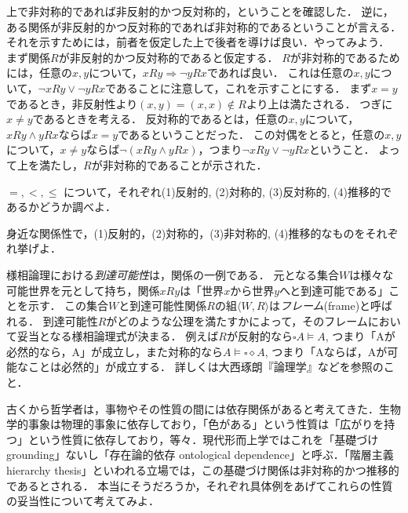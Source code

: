 \documentclass[11pt,a4paper]{jsarticle} %
\begin{document}
上で非対称的であれば非反射的かつ反対称的，ということを確認した．
逆に，ある関係が非反射的かつ反対称的であれば非対称的であるということが言える．
それを示すためには，前者を仮定した上で後者を導けば良い．やってみよう．
まず関係$R$が非反射的かつ反対称的であると仮定する．
$R$が非対称的であるためには，任意の$x,y$について，$xRy \Rightarrow \neg yRx$であれば良い．
これは任意の$x,y$について，$\neg xRy \vee \neg yRx$であることに注意して，これを示すことにする．
まず$x=y$であるとき，非反射性より$(x,y) = (x,x) \not\in R$より上は満たされる．
つぎに$x\neq y$であるときを考える．
反対称的であるとは，任意の$x,y$について，$xRy \wedge yRx$ならば$x=y$であるということだった．
この対偶をとると，任意の$x,y$について，$x\neq y$ならば$\neg (xRy \wedge yRx)$，つまり$\neg xRy \vee \neg yRx$ということ．
よって上を満たし，$R$が非対称的であることが示された．



\begin{exercise}
 $=, <, \leq$ について，それぞれ(1)反射的, (2)対称的, (3)反対称的, (4)推移的であるかどうか調べよ．
\end{exercise}


\begin{exercise}
身近な関係性で，(1)反射的，(2)対称的，(3)非対称的, (4)推移的なものをそれぞれ挙げよ．
\end{exercise}



\begin{example}[到達可能性]
様相論理における\emph{到達可能性}は，関係の一例である．
元となる集合$W$は様々な可能世界を元として持ち，関係$xRy$は「世界$x$から世界$y$へと到達可能である」ことを示す．
この集合$W$と到達可能性関係$R$の組$\langle W, R \rangle$は\emph{フレーム}(frame)と呼ばれる．
到達可能性$R$がどのような公理を満たすかによって，そのフレームにおいて妥当となる様相論理式が決まる．
例えば$R$が反射的なら$\square A \models A$, つまり「Aが必然的なら，A」が成立し，また対称的なら$A \models \square \diamond A$, つまり「Aならば，Aが可能なことは必然的」が成立する．
詳しくは大西琢朗『論理学』などを参照のこと．
\end{example}


\begin{example}[Grounding]
 古くから哲学者は，事物やその性質の間には依存関係があると考えてきた．生物学的事象は物理的事象に依存しており，「色がある」という性質は「広がりを持つ」という性質に依存しており，等々．現代形而上学ではこれを「基礎づけ grounding」ないし「存在論的依存 ontological dependence」と呼ぶ．「階層主義 hierarchy thesis」といわれる立場では，この基礎づけ関係は非対称的かつ推移的であるとされる．
本当にそうだろうか，それぞれ具体例をあげてこれらの性質の妥当性について考えてみよ．
\end{example}
\end{document}
